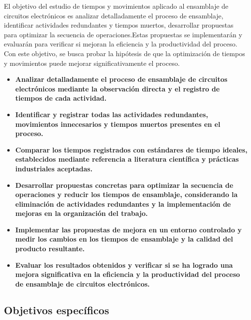     El objetivo del estudio de tiempos y movimientos aplicado al ensamblaje de circuitos electrónicos es analizar detalladamente el proceso de ensamblaje, identificar actividades redundantes y tiempos muertos, desarrollar propuestas para optimizar la secuencia de operaciones.Estas propuestas se implementarán y evaluarán para verificar si mejoran la eficiencia y la productividad del proceso. Con este objetivo, se busca probar la hipótesis de que la optimización de tiempos y movimientos puede mejorar significativamente el proceso.
    \begin{itemize}
    
    \item \textbf{Analizar detalladamente el proceso de ensamblaje de circuitos electrónicos mediante la observación directa y el registro de tiempos de cada actividad.}
    \item \textbf{Identificar y registrar todas las actividades redundantes, movimientos innecesarios y tiempos muertos presentes en el proceso.}
    \item \textbf{Comparar los tiempos registrados con estándares de tiempo ideales, establecidos mediante referencia a literatura científica y prácticas industriales aceptadas.}
    \item \textbf{Desarrollar propuestas concretas para optimizar la secuencia de operaciones y reducir los tiempos de ensamblaje, considerando la eliminación de actividades redundantes y la implementación de mejoras en la organización del trabajo.}
    \item \textbf{Implementar las propuestas de mejora en un entorno controlado y medir los cambios en los tiempos de ensamblaje y la calidad del producto resultante.}
    \item \textbf{Evaluar los resultados obtenidos y verificar si se ha logrado una mejora significativa en la eficiencia y la productividad del proceso de ensamblaje de circuitos electrónicos.}
    
    \end{itemize}
    
    \subsection{Objetivos específicos }
    
